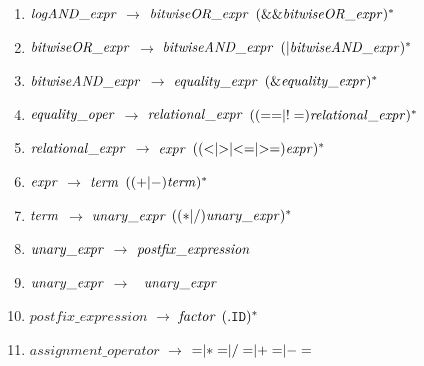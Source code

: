 \begin{enumerate}

\item ${\it logAND\_expr}$ $\rightarrow$ ${\it bitwiseOR\_expr}$ $({\tt \&\&} {\it bitwiseOR\_expr})^{*}$\\


\item ${\it bitwiseOR\_expr}$ $\rightarrow$ ${\it bitwiseAND\_expr}$ $({\tt |} {\it bitwiseAND\_expr})^{*}$\\
\item ${\it bitwiseAND\_expr}$ $\rightarrow$ ${\it equality\_expr}$ $({\tt \&} {\it equality\_expr})^{*}$\\

\item ${\it equality\_oper}$ $\rightarrow$ ${\it relational\_expr}$ $(({\tt ==}{\tt |}{\tt !=}) {\it relational\_expr})^{*}$\\

\item ${\it relational\_expr}$ $\rightarrow$ ${\it expr}$ $(({\tt <}|{\tt >}|{\tt <=}|{\tt >=}) {\it expr})^{*}$\\

\item ${\it expr}$ $\rightarrow$  ${\it term}$ $(({\tt +} |{\tt  -} ){\it term})^{*}$\\ 
\item ${\it term}$ $\rightarrow$ ${\it unary\_expr}$ $(({\tt *} |{\tt /}) {\it unary\_expr })^{*}$ \\
 
\item ${\it unary\_expr}$ $\rightarrow$ ${\it postfix\_expression}$\\
\item ${\it unary\_expr}$ $\rightarrow$ ~${\it unary\_expr}$\\

\item ${postfix\_expression}$ $\rightarrow$ ${\it factor}$ $( . {\tt ID})^{*}$\\
 
\item ${assignment\_operator}$ $\rightarrow$ ${\tt =} | {\tt *= } | {\tt /=} | {\tt += } | {\tt -=}$


\end{enumerate}
